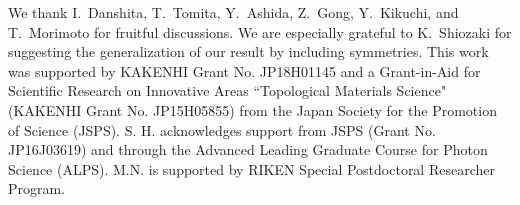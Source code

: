 \documentclass[
floatfix,
pra,
twocolumn,
reprint,
amsmath,amssymb,
aps,
footnote,
]{revtex4}
\begin{document}
\begin{acknowledgments}
We thank I.\ Danshita, T.\ Tomita, Y.\ Ashida, Z.\ Gong, Y.\  Kikuchi, and T.\ Morimoto for fruitful discussions.
We are especially grateful to K.\ Shiozaki for suggesting the generalization of our result by including symmetries.
This work was supported by KAKENHI Grant No. JP18H01145 and a Grant-in-Aid for Scientific Research on Innovative Areas ``Topological Materials Science" (KAKENHI Grant No. JP15H05855) from the Japan Society for the Promotion of Science (JSPS).
S. H. acknowledges support from JSPS (Grant No. JP16J03619) and through the Advanced Leading Graduate Course for Photon Science (ALPS).
M.N. is supported by RIKEN Special Postdoctoral Researcher Program.
\end{acknowledgments}





\appendix
\end{document}
